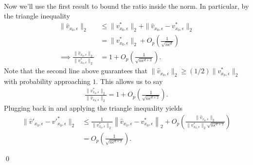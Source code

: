 \documentclass[11pt]{article}
\begin{document}
Now we'll use the first result to bound the ratio inside the norm. In particular, by the triangle inequality
\begin{align*} 
    \|\hat{v}_{x_0, \epsilon}\|_2  &\leq \|v^*_{x_0, \epsilon}\|_2 + \|\hat{v}_{x_0, \epsilon} - v^*_{x_0, \epsilon}\|_2 \\
    &= \|v^*_{x_0, \epsilon}\|_2 + O_p\left(\frac{1}{\sqrt{n\epsilon^d}}\right) \\
    \implies \frac{\|\hat{v}_{x_0, \epsilon}\|_2}{\|v^*_{x_0, \epsilon}\|_2} &= 1 + O_p\left(\frac{1}{\sqrt{n\epsilon^{d+2}}}\right). 
\end{align*}
Note that the second line above guarantees that $\|\hat{v}_{x_0, \epsilon}\|_2 \geq (1/2)\|v^*_{x_0, \epsilon}\|_2$ with probability approaching $1$. This allows us to say
\begin{align}
    \frac{\|v^*_{x_0, \epsilon}\|_2}{\|\hat{v}_{x_0, \epsilon}\|_2} = 1 + O_p\left(\frac{1}{\sqrt{n\epsilon^{d+2}}}\right). \label{eq: velocity norm ratio}
\end{align}
Plugging back in and applying the triangle inequality yields
\begin{align*}
    \|\hat{v}'_{x_0, \epsilon} - v'^*_{x_0, \epsilon}\|_2     &\leq \frac{1}{\|v^*_{x_0, \epsilon}\|_2}\left\|\hat{v}_{x_0, \epsilon} - v^*_{x_0, \epsilon} \right\|_2 + O_p\left(\frac{\|\hat{v}_{x_0, \epsilon}\|_2}{\|v^*_{x_0, \epsilon}\|_2\sqrt{n\epsilon^{d+2}}}\right) \\
    &= O_p\left(\frac{1}{\sqrt{n\epsilon^{d+2}}}\right) .
\end{align*}

\qed{}
\end{document}
